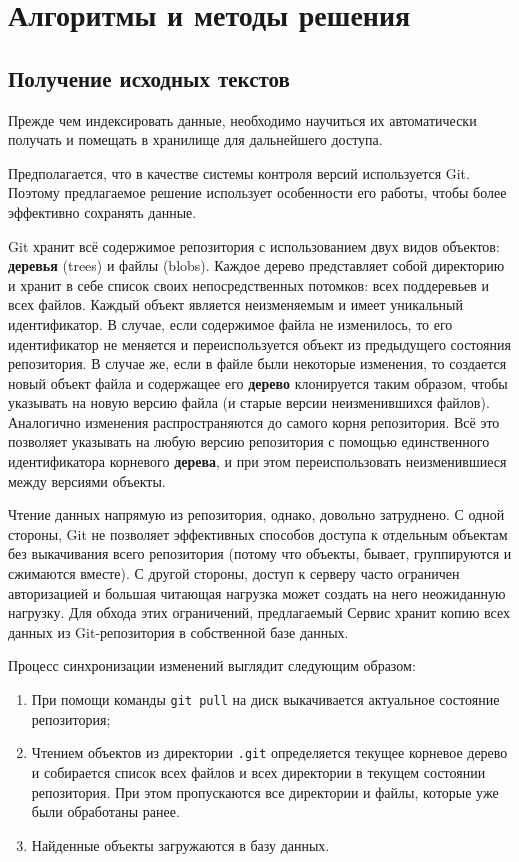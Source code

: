 \chapter{Алгоритмы и методы решения}
\label{chap:solution}

\section{Получение исходных текстов}

Прежде чем индексировать данные, необходимо научиться их автоматически получать и помещать в хранилище для дальнейшего доступа.

Предполагается, что в качестве системы контроля версий используется Git. Поэтому предлагаемое решение использует особенности его работы, чтобы более эффективно сохранять данные.

Git хранит всё содержимое репозитория с использованием двух видов объектов: \textbf{деревья} (trees) и файлы (blobs). Каждое дерево представляет собой директорию и хранит в себе список своих непосредственных потомков: всех поддеревьев и всех файлов. Каждый объект является неизменяемым и имеет уникальный идентификатор. В случае, если содержимое файла не изменилось, то его идентификатор не меняется и переиспользуется объект из предыдущего состояния репозитория. В случае же, если в файле были некоторые изменения, то создается новый объект файла и содержащее его \textbf{дерево} клонируется таким образом, чтобы указывать на новую версию файла (и старые версии неизменившихся файлов). Аналогично изменения распространяются до самого корня репозитория. Всё это позволяет указывать на любую версию репозитория с помощью единственного идентификатора корневого \textbf{дерева}, и при этом переиспользовать неизменившиеся между версиями объекты.

Чтение данных напрямую из репозитория, однако, довольно затруднено. С одной стороны, Git не позволяет эффективных способов доступа к отдельным объектам без выкачивания всего репозитория (потому что объекты, бывает, группируются и сжимаются вместе). С другой стороны, доступ к серверу часто ограничен авторизацией и большая читающая нагрузка может создать на него неожиданную нагрузку. Для обхода этих ограничений, предлагаемый Сервис хранит копию всех данных из Git-репозитория в собственной базе данных.

Процесс синхронизации изменений выглядит следующим образом:

\begin{enumerate}
    \item При помощи команды \texttt{git pull} на диск выкачивается актуальное состояние репозитория;
    \item Чтением объектов из директории \texttt{.git} определяется текущее корневое дерево и собирается список всех файлов и всех директории в текущем состоянии репозитория. При этом пропускаются все директории и файлы, которые уже были обработаны ранее.
    \item Найденные объекты загружаются в базу данных.
\end{enumerate}

